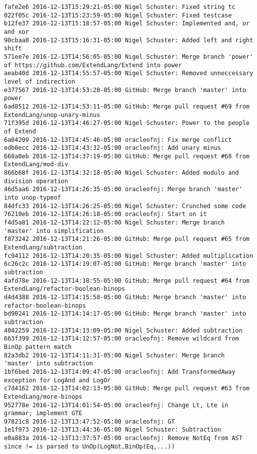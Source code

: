 \begin{lstlisting}
fafe2e6 2016-12-13T15:29:21-05:00 Nigel Schuster: Fixed string tc
022f05c 2016-12-13T15:23:59-05:00 Nigel Schuster: Fixed testcase
b12fe37 2016-12-13T15:18:57-05:00 Nigel Schuster: Implemented and, or and xor
90cbaa0 2016-12-13T15:16:31-05:00 Nigel Schuster: Added left and right shift
571ee7e 2016-12-13T14:56:05-05:00 Nigel Schuster: Merge branch 'power' of https://github.com/ExtendLang/Extend into power
aeab40d 2016-12-13T14:55:57-05:00 Nigel Schuster: Removed unneccessary level of indirection
e377567 2016-12-13T14:53:28-05:00 GitHub: Merge branch 'master' into power
6ad8512 2016-12-13T14:53:11-05:00 GitHub: Merge pull request #69 from ExtendLang/unop-unary-minus
71f395d 2016-12-13T14:46:27-05:00 Nigel Schuster: Power to the people of Extend
6a04209 2016-12-13T14:45:46-05:00 oracleofnj: Fix merge conflict
edb0ecc 2016-12-13T14:43:32-05:00 oracleofnj: Add unary minus
668a0eb 2016-12-13T14:37:19-05:00 GitHub: Merge pull request #68 from ExtendLang/mod-div
866b68f 2016-12-13T14:32:18-05:00 Nigel Schuster: Added modulo and division operation
46d5aa6 2016-12-13T14:26:35-05:00 oracleofnj: Merge branch 'master' into unop-typeof
84dfc33 2016-12-13T14:26:25-05:00 Nigel Schuster: Crunched some code
76210eb 2016-12-13T14:26:18-05:00 oracleofnj: Start on it
f4d5a81 2016-12-13T14:22:12-05:00 Nigel Schuster: Merge branch 'master' into simplification
f873242 2016-12-13T14:21:26-05:00 GitHub: Merge pull request #65 from ExtendLang/subtraction
fc94112 2016-12-13T14:20:35-05:00 Nigel Schuster: Added multiplication
6c26c2c 2016-12-13T14:19:07-05:00 GitHub: Merge branch 'master' into subtraction
4afd78e 2016-12-13T14:18:55-05:00 GitHub: Merge pull request #64 from ExtendLang/refactor-boolean-binops
d4d4388 2016-12-13T14:15:58-05:00 GitHub: Merge branch 'master' into refactor-boolean-binops
bd90241 2016-12-13T14:14:17-05:00 GitHub: Merge branch 'master' into subtraction
4042259 2016-12-13T14:13:09-05:00 Nigel Schuster: Added subtraction
663f399 2016-12-13T14:12:57-05:00 oracleofnj: Remove wildcard from BinOp pattern match
82a3db2 2016-12-13T14:11:31-05:00 Nigel Schuster: Merge branch 'master' into subtraction
1bf6bed 2016-12-13T14:09:47-05:00 oracleofnj: Add TransformedAway exception for LogAnd and LogOr
c7d4162 2016-12-13T14:02:13-05:00 GitHub: Merge pull request #63 from ExtendLang/more-binops
952778e 2016-12-13T14:01:54-05:00 oracleofnj: Change Lt, Lte in grammar; implement GTE
97821c8 2016-12-13T13:47:52-05:00 oracleofnj: GT
1e1f973 2016-12-13T13:44:36-05:00 Nigel Schuster: Subtraction
e0a883a 2016-12-13T13:37:57-05:00 oracleofnj: Remove NotEq from AST since != is parsed to UnOp(LogNot,BinOp(Eq,...))

\end{lstlisting}
